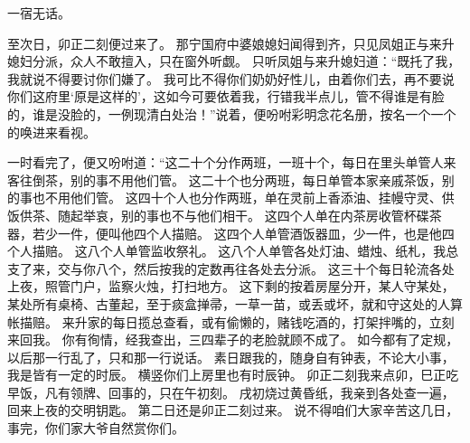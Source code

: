 一宿无话。
\par
至次日，卯正二刻便过来了。
那宁国府中婆娘媳妇闻得到齐，只见凤姐正与来升媳妇分派，众人不敢擅入，只在窗外听觑。
只听凤姐与来升媳妇道：“既托了我，我就说不得要讨你们嫌了。
我可比不得你们奶奶好性儿，由着你们去，再不要说你们这府里‘原是这样的’，这如今可要依着我，行错我半点儿，管不得谁是有脸的，谁是没脸的，一例现清白处治！”说着，便吩咐彩明念花名册，按名一个一个的唤进来看视。
\par
一时看完了，便又吩咐道：“这二十个分作两班，一班十个，每日在里头单管人来客往倒茶，别的事不用他们管。
这二十个也分两班，每日单管本家亲戚茶饭，别的事也不用他们管。
这四十个人也分作两班，单在灵前上香添油、挂幔守灵、供饭供茶、随起举哀，别的事也不与他们相干。
这四个人单在内茶房收管杯碟茶器，若少一件，便叫他四个人描赔。
这四个人单管酒饭器皿，少一件，也是他四个人描赔。
这八个人单管监收祭礼。
这八个人单管各处灯油、蜡烛、纸札，我总支了来，交与你八个，然后按我的定数再往各处去分派。
这三十个每日轮流各处上夜，照管门户，监察火烛，打扫地方。
这下剩的按着房屋分开，某人守某处，某处所有桌椅、古董起，至于痰盒掸帚，一草一苗，或丢或坏，就和守这处的人算帐描赔。
来升家的每日揽总查看，或有偷懒的，赌钱吃酒的，打架拌嘴的，立刻来回我。
你有徇情，经我查出，三四辈子的老脸就顾不成了。
如今都有了定规，以后那一行乱了，只和那一行说话。
素日跟我的，随身自有钟表，不论大小事，我是皆有一定的时辰。
横竖你们上房里也有时辰钟。
卯正二刻我来点卯，巳正吃早饭，凡有领牌、回事的，只在午初刻。
戌初烧过黄昏纸，我亲到各处查一遍，回来上夜的交明钥匙。
第二日还是卯正二刻过来。
说不得咱们大家辛苦这几日，事完，你们家大爷自然赏你们。
